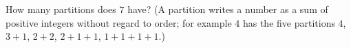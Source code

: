 How many partitions does $7$ have? (A partition writes a number as a sum of positive integers without regard to order; for example $4$ has the five partitions $4$, $3+1$, $2+2$, $2+1+1$, $1+1+1+1$.)
